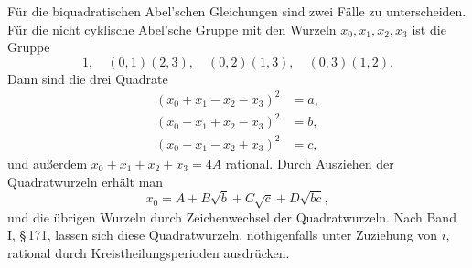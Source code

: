 \documentclass[11pt]{article}
\begin{document}
Für die biquadratischen Abel'schen Gleichungen sind zwei Fälle zu unterscheiden. Für die nicht cyklische Abel'sche Gruppe mit den Wurzeln $x_0,x_1,x_2,x_3$ ist die Gruppe
\begin{equation}
  1,
  \quad (0,1)(2,3),
  \quad (0,2)(1,3),
  \quad (0,3)(1,2).
  \tag{1}
\end{equation}
Dann sind die drei Quadrate
\begin{equation}
\begin{aligned}
 (x_0+x_1-x_2-x_3)^2&=a,\\
 (x_0-x_1+x_2-x_3)^2&=b,\\
 (x_0-x_1-x_2+x_3)^2&=c,
\end{aligned}
\tag{2}
\end{equation}
und außerdem $x_0+x_1+x_2+x_3=4A$ rational. Durch Ausziehen der Quadratwurzeln erhält man
\begin{equation}
   x_0=A+B\sqrt b+C\sqrt c+D\sqrt{bc},
   \tag{3}
\end{equation}
und die übrigen Wurzeln durch Zeichenwechsel der Quadratwurzeln. Nach Band I, \S\,171, lassen sich diese Quadratwurzeln, nöthigenfalls unter Zuziehung von $i$, rational durch Kreistheilungsperioden ausdrücken.
\end{document}
